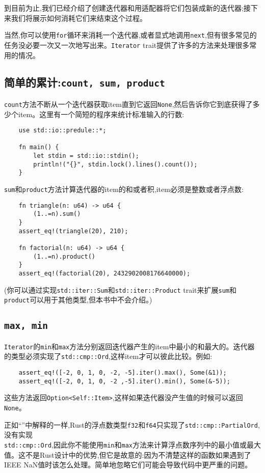 到目前为止,我们已经介绍了创建迭代器和用适配器将它们包装成新的迭代器;接下来我们将展示如何消耗它们来结束这个过程。

当然,你可以使用\texttt{for}循环来消耗一个迭代器,或者显式地调用\texttt{next},但有很多常见的任务没必要一次又一次地写出来。\texttt{Iterator} trait提供了许多的方法来处理很多常用的情况。

\subsection{简单的累计:\texttt{count, sum, product}}
\texttt{count}方法不断从一个迭代器获取item直到它返回\texttt{None},然后告诉你它到底获得了多少个item。这里有一个简短的程序来统计标准输入的行数:
\begin{verbatim}
    use std::io::predule::*;

    fn main() {
        let stdin = std::io::stdin();
        println!("{}", stdin.lock().lines().count());
    }
\end{verbatim}

\texttt{sum}和\texttt{product}方法计算迭代器的item的和或者积,item必须是整数或者浮点数:
\begin{verbatim}
    fn triangle(n: u64) -> u64 {
        (1..=n).sum()
    }
    assert_eq!(triangle(20), 210);

    fn factorial(n: u64) -> u64 {
        (1..=n).product()
    }
    assert_eq!(factorial(20), 2432902008176640000);
\end{verbatim}

(你可以通过实现\texttt{std::iter::Sum}和\texttt{std::iter::Product} trait来扩展\texttt{sum}和\texttt{product}可以用于其他类型,但本书中不会介绍。)

\subsection{\texttt{max, min}}
\texttt{Iterator}的\texttt{min}和\texttt{max}方法分别返回迭代器产生的item中最小的和最大的。迭代器的类型必须实现了\texttt{std::cmp::Ord},这样item才可以彼此比较。例如:
\begin{verbatim}
    assert_eq!([-2, 0, 1, 0, -2, -5].iter().max(), Some(&1));
    assert_eq!([-2, 0, 1, 0, -2 ,-5].iter().min(), Some(&-5));
\end{verbatim}

这些方法返回\texttt{Option<Self::Item>},这样如果迭代器没产生值的时候可以返回\texttt{None}。

正如“”中解释的一样,Rust的浮点数类型\texttt{f32}和\texttt{f64}只实现了\texttt{std::cmp::PartialOrd},没有实现\\
\texttt{std::cmp::Ord},因此你不能使用\texttt{min}和\texttt{max}方法来计算浮点数序列中的最小值或最大值。这不是Rust设计中的优势,但它是故意的:因为不清楚这样的函数如果遇到了IEEE NaN值时该怎么处理。简单地忽略它们可能会导致代码中更严重的问题。

